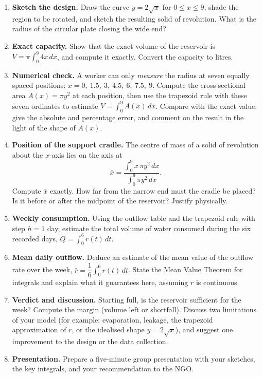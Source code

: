 \documentclass[11pt]{article}
\newcommand{\cle}[1]{{\popxbold\color{popdark}#1}}
\newcounter{popsec}
\newcounter{popsub}
\newcommand{\courssub}[1]{%
  \stepcounter{popsub}%
  \par\vspace{9pt}\noindent{\popxbold\fontsize{11.5}{13}\selectfont\color{popink}{\color{poporange}\thepopsec.\thepopsub}\hspace{6pt}#1}\par\nopagebreak\vspace{4pt}
}
\begin{document}
\courssub{Tasks}

\begin{enumerate}
\item \textbf{Sketch the design.} Draw the curve $y=2\sqrt{x}$ for $0\le x\le 9$, shade the region to be rotated, and sketch the resulting solid of revolution. What is the radius of the circular plate closing the wide end?
\item \textbf{Exact capacity.} Show that the exact volume of the reservoir is $V=\pi\displaystyle\int_0^9 4x\,dx$, and compute it exactly. Convert the capacity to litres.
\item \textbf{Numerical check.} A worker can only \emph{measure} the radius at seven equally spaced positions: $x=0,\ 1.5,\ 3,\ 4.5,\ 6,\ 7.5,\ 9$. Compute the cross-sectional area $A(x)=\pi y^2$ at each position, then use the \cle{trapezoid rule} with these seven ordinates to estimate $V=\displaystyle\int_0^9 A(x)\,dx$. Compare with the exact value: give the absolute and percentage error, and comment on the result in the light of the shape of $A(x)$.
\item \textbf{Position of the support cradle.} The centre of mass of a solid of revolution about the $x$-axis lies on the axis at
\[
\bar{x}=\dfrac{\displaystyle\int_0^9 x\,\pi y^2\,dx}{\displaystyle\int_0^9 \pi y^2\,dx}.
\]
Compute $\bar{x}$ exactly. How far from the narrow end must the cradle be placed? Is it before or after the midpoint of the reservoir? Justify physically.
\item \textbf{Weekly consumption.} Using the outflow table and the trapezoid rule with step $h=1$ day, estimate the total volume of water consumed during the six recorded days, $Q=\displaystyle\int_0^6 r(t)\,dt$.
\item \textbf{Mean daily outflow.} Deduce an estimate of the \cle{mean value} of the outflow rate over the week, $\bar{r}=\dfrac{1}{6}\displaystyle\int_0^6 r(t)\,dt$. State the Mean Value Theorem for integrals and explain what it guarantees here, assuming $r$ is continuous.
\item \textbf{Verdict and discussion.} Starting full, is the reservoir sufficient for the week? Compute the margin (volume left or shortfall). Discuss two limitations of your model (for example: evaporation, leakage, the trapezoid approximation of $r$, or the idealised shape $y=2\sqrt{x}$), and suggest one improvement to the design or the data collection.
\item \textbf{Presentation.} Prepare a five-minute group presentation with your sketches, the key integrals, and your recommendation to the NGO.
\end{enumerate}
\end{document}
